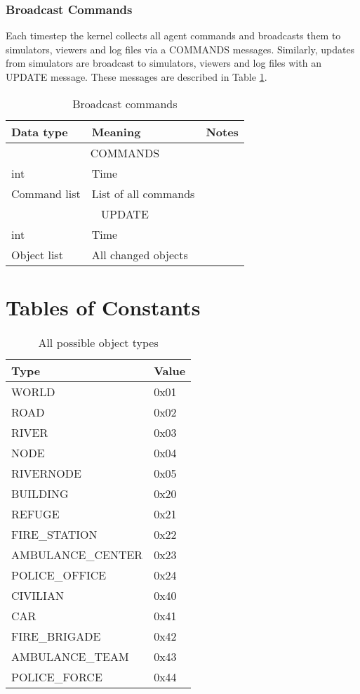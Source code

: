 \subsubsection{Broadcast Commands}
\label{section_broadcast_commands}
Each timestep the kernel collects all agent commands and broadcasts them to simulators, viewers and log files via a COMMANDS messages. Similarly, updates from simulators are broadcast to simulators, viewers and log files with an UPDATE message. These messages are described in Table \ref{table_broadcast_commands}.

\begin{table}[p]
\center
\begin{tabular}{|lll|}
\hline
Data type & Meaning & Notes\\
\hline
\hline
\multicolumn{3}{|c|}{COMMANDS}\\
int & Time & \\
Command list & List of all commands & \\
\hline
\hline
\multicolumn{3}{|c|}{UPDATE}\\
int & Time & \\
Object list & All changed objects & \\
\hline
\end{tabular}
\caption{Broadcast commands}
\label{table_broadcast_commands}
\end{table}

\clearpage
\renewcommand{\thesection}{Appendix \Alph{section}}
\setcounter{section}{0}
\section{Tables of Constants}

\begin{table}[pht]
\center
\begin{tabular}{|l|l|}
\hline
Type & Value\\
\hline
WORLD & 0x01 \\
ROAD & 0x02 \\
RIVER & 0x03 \\
NODE & 0x04 \\
RIVERNODE & 0x05 \\
BUILDING & 0x20 \\
REFUGE & 0x21 \\
FIRE\_STATION & 0x22 \\
AMBULANCE\_CENTER & 0x23 \\
POLICE\_OFFICE & 0x24 \\
CIVILIAN & 0x40 \\
CAR & 0x41 \\
FIRE\_BRIGADE & 0x42 \\
AMBULANCE\_TEAM & 0x43 \\
POLICE\_FORCE & 0x44 \\
\hline
\end{tabular}
\caption{All possible object types}
\label{table_object_types}
\end{table}

